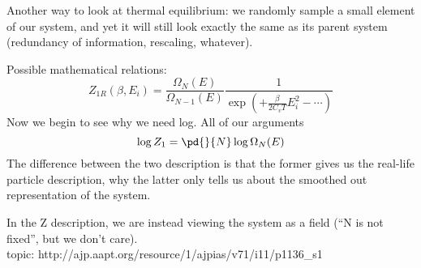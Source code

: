         Another way to look at thermal equilibrium: we randomly sample a small element of our system, and yet it will still look exactly the same as its parent system (redundancy of information, rescaling, whatever).

        Possible mathematical relations:
        \[Z_{1R}(\beta,E_i)  = \frac{\Omega_N(E)}{ \Omega_{N-1}(E)}\frac1{\exp(+ \frac{\beta}{2C_v T}E_i^2 - \cdots  )}\]
            Now we begin to see why we need log. All of our arguments
            \[\log Z_1 = \pd{}{N}\log \Omega_N(E)\]
        The difference between the two description is that the former gives us the real-life particle description, why the latter only tells us about the smoothed out representation of the system.

        In the Z description, we are instead viewing the system as a field (``N is not fixed'', but we don't care).\\
        topic: http://ajp.aapt.org/resource/1/ajpias/v71/i11/p1136_s1


